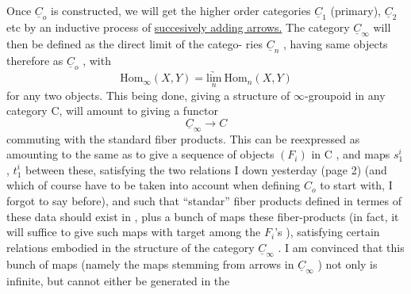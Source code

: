 Once $\underline{C}_o$ is constructed, we will get the higher order categories
$\underline{C}_1$ (primary), $\underline{C}_2$ etc by an inductive process of \uline{succesively adding arrows.}
The category $\underline{C}_\infty$ will then be defined as the direct limit of the catego-%
ries $\underline{C}_n$ , having  same objects therefore as $\underline{C}_o$ , with
\[ \mathrm{Hom}_\infty(X,Y) = \underset{n}{\underrightarrow{\mathrm{lim}}}\ \mathrm{Hom}_n(X,Y) \]
for any two objects. This being done, giving a structure of $\infty$-groupoid
in any category C, will amount to giving a functor
\[ \underline{C}_\infty \longrightarrow C \]
commuting with the standard  fiber products. This can be reexpressed\inserted{,} as
amounting to the same as to give a sequence of objects $(F_i)$ in C , 
and maps $s^i_1$ , $t^i_1$ between these, satisfying the two  relations I  down
yesterday (page 2) (and which of course have to be taken into account
when defining $C_o$ to start with, I forgot to say before), and such that
``standar'' fiber products  defined in termes of these data should exist in
, plus a bunch of maps  these fiber-products  (in fact, it will
suffice to give such maps with target among the $F_i$'s ), satisfying
certain relations embodied in the structure of the category $\underline{C}_\infty$ . I am
convinced that this bunch of maps (namely the maps stemming from arrows
in $\underline{C}_\infty$ ) not only is infinite, but cannot either be generated in the

